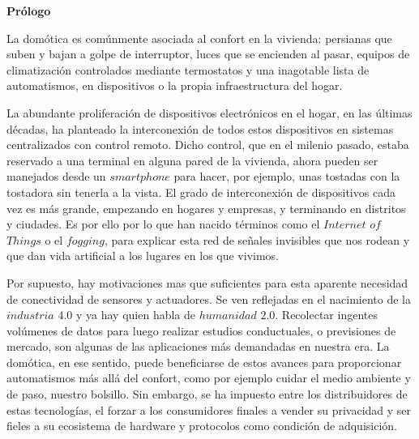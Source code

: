 
\newpage

\thispagestyle{empty}
\begin{center}

{\bf \Huge Prólogo}
\end{center}
\vspace{1cm}


La domótica es comúnmente asociada al confort en la vivienda: persianas que suben y bajan a golpe de interruptor, luces que se encienden al pasar, equipos de climatización controlados mediante termostatos y una inagotable lista de automatismos, en dispositivos o la propia infraestructura del hogar.

\vspace{0.5cm}

La abundante proliferación de dispositivos electrónicos en el hogar, en las últimas décadas, ha planteado la interconexión de todos estos dispositivos en sistemas centralizados con control remoto. Dicho control, que en el milenio pasado, estaba reservado a una terminal en alguna pared de la vivienda, ahora pueden ser manejados desde un $smartphone$ para hacer, por ejemplo, unas tostadas con la tostadora sin tenerla a la vista. El grado de interconexión de dispositivos cada vez es más grande, empezando en hogares y empresas, y terminando en distritos y ciudades. Es por ello por lo que han nacido términos como el $Internet$ $of$ $Things$ o el $fogging$, para explicar esta red de señales invisibles que nos rodean y que dan vida artificial a los lugares en los que vivimos.

\vspace{0.5cm}

Por supuesto, hay motivaciones mas que suficientes para esta aparente necesidad de conectividad de sensores y actuadores. Se ven reflejadas en el nacimiento de la $industria$ $4{.}0$ y ya hay quien habla de $humanidad$ $2{.}0$. Recolectar ingentes volúmenes de datos para luego realizar estudios conductuales, o previsiones de mercado, son algunas de las aplicaciones más demandadas en nuestra era. La domótica, en ese sentido, puede beneficiarse de estos avances para proporcionar automatismos más allá del confort, como por ejemplo cuidar el medio ambiente y de paso, nuestro bolsillo. Sin embargo, se ha impuesto entre los distribuidores de estas tecnologías, el forzar a los consumidores finales a vender su privacidad y ser fieles a su ecosistema de hardware y protocolos como condición de adquisición.

